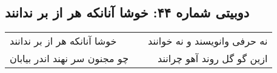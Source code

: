 \begin{center}
\section*{دوبیتی شماره ۴۴: خوشا آنانکه هر از بر ندانند}
\label{sec:044}
\begin{longtable}{l p{0.5cm} r}
خوشا آنانکه هر از بر ندانند
&&
نه حرفی وانویسند و نه خوانند
\\
چو مجنون سر نهند اندر بیابان
&&
ازین گو گل روند آهو چرانند
\\
\end{longtable}
\end{center}
